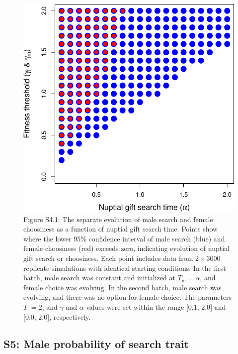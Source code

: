 \documentclass[
]{article}
\begin{document}
\begin{figure}
\centering
\includegraphics{SI_files/figure-latex/unnamed-chunk-9-1.pdf}
\caption{Figure S4.1: The separate evolution of male search and female
choosiness as a function of nuptial gift search time. Points show where
the lower 95\% confidence interval of male search (blue) and female
choosiness (red) exceeds zero, indicating evolution of nuptial gift
search or choosiness. Each point includes data from \(2 \times 3000\)
replicate simulations with identical starting conditions. In the first
batch, male search was constant and initialized at
\(T_{\mathrm{m}} = \alpha\), and female choice was evolving. In the
second batch, male search was evolving, and there was no option for
female choice. The parameters \(T_{\mathrm{f}}=2\), and \(\gamma\) and
\(\alpha\) values were set within the range {[}0.1, 2.0{]} and {[}0.0,
2.0{]}, respectively.}
\end{figure}

\captionsetup{labelformat=default}

\clearpage

\hypertarget{s5-male-probability-of-search-trait}{%
\subsection{S5: Male probability of search
trait}\label{s5-male-probability-of-search-trait}}
\end{document}
